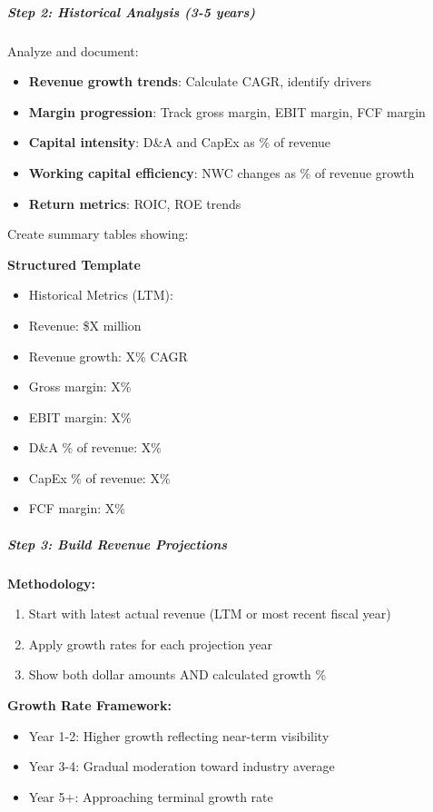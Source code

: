 \documentclass[11pt]{article}
\begin{document}
\subparagraph{Step 2: Historical Analysis (3-5 years)}\mbox{}\par

Analyze and document:

\begin{itemize}[leftmargin=*,itemsep=2pt,topsep=2pt]
\item {} \textbf{Revenue growth trends}: Calculate CAGR, identify drivers
\item {} \textbf{Margin progression}: Track gross margin, EBIT margin, FCF margin
\item {} \textbf{Capital intensity}: D\&A and CapEx as \% of revenue
\item {} \textbf{Working capital efficiency}: NWC changes as \% of revenue growth
\item {} \textbf{Return metrics}: ROIC, ROE trends
\end{itemize}

Create summary tables showing:

\textbf{Structured Template}
\begin{itemize}[leftmargin=*,itemsep=2pt,topsep=2pt]
\item {} Historical Metrics (LTM):
\item {} Revenue: \$X million
\item {} Revenue growth: X\% CAGR
\item {} Gross margin: X\%
\item {} EBIT margin: X\%
\item {} D\&A \% of revenue: X\%
\item {} CapEx \% of revenue: X\%
\item {} FCF margin: X\%
\end{itemize}

\subparagraph{Step 3: Build Revenue Projections}\mbox{}\par

\textbf{Methodology:}

\begin{enumerate}[leftmargin=*,itemsep=2pt,topsep=2pt]
\item {} Start with latest actual revenue (LTM or most recent fiscal year)
\item {} Apply growth rates for each projection year
\item {} Show both dollar amounts AND calculated growth \%
\end{enumerate}

\textbf{Growth Rate Framework:}

\begin{itemize}[leftmargin=*,itemsep=2pt,topsep=2pt]
\item {} Year 1-2: Higher growth reflecting near-term visibility
\item {} Year 3-4: Gradual moderation toward industry average
\item {} Year 5+: Approaching terminal growth rate
\end{itemize}
\end{document}
